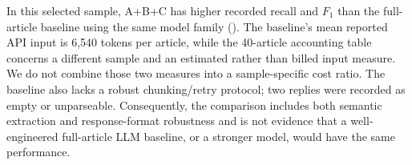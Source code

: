 In this selected sample, A+B+C has higher recorded recall and $F_1$ than the full-article
baseline using the same model family (). The baseline's mean reported API input
is 6,540 tokens per article, while the 40-article accounting table concerns a different sample
and an estimated rather than billed input measure. We do not combine those two measures into a
sample-specific cost ratio. The baseline also lacks a robust chunking/retry protocol; two replies
were recorded as empty or unparseable. Consequently, the comparison includes both semantic
extraction and response-format robustness and is not evidence that a well-engineered full-article
LLM baseline, or a stronger model, would have the same performance.
